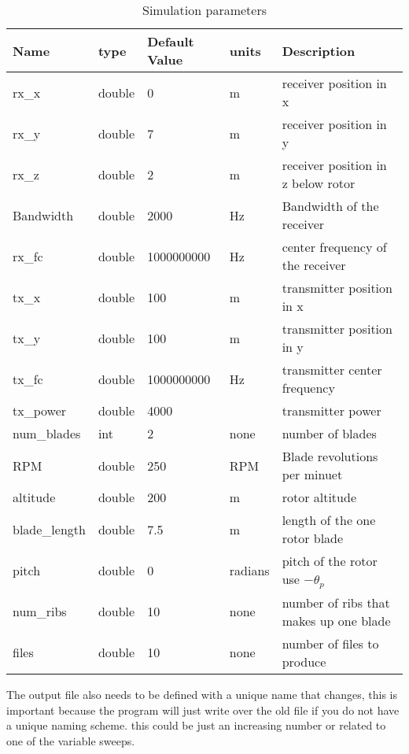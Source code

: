 \begin{table}
\begin{center}
    \begin{tabular}{ | l | l | l | l | p{3cm} |}
    \hline
    Name & type & Default Value& units & Description\\ \hline
     rx\_x &  double & 0 & m & receiver position in x  \\ \hline
     rx\_y & double & 7 & m & receiver position in y \\ \hline 
     rx\_z & double & 2 & m & receiver position in z below rotor  \\ \hline
     Bandwidth & double & 2000 & Hz & Bandwidth of the receiver  \\ \hline
     rx\_fc & double & 1000000000 & Hz & center frequency of the receiver \\ \hline 
     tx\_x & double & 100 & m & transmitter position in x \\ \hline
     tx\_y & double & 100 & m & transmitter position in y \\ \hline
     tx\_fc & double & 1000000000 & Hz & transmitter center frequency \\ \hline
     tx\_power & double & 4000 & & transmitter power \\ \hline
     num\_blades & int & 2 & none & number of blades \\ \hline
     RPM & double & 250 & RPM & Blade revolutions per minuet \\ \hline
     altitude & double & 200 & m & rotor altitude \\ \hline
     blade\_length & double & 7.5 & m & length of the one rotor blade \\ \hline
     pitch & double & 0 & radians & pitch of the rotor use $-\theta_p$  \\ \hline
     num\_ribs & double & 10 & none & number of ribs that makes up one blade \\ \hline
     files & double & 10 & none & number of files to produce \\ \hline
    \end{tabular}
     \caption{Simulation parameters}
    \label{tab:key_values}
\end{center}
\end{table}
    
The output file also needs to be defined with a unique name that changes, this is important because the program will just write over the old file if you do not have a unique naming scheme. this could be just an increasing number or related to one of the variable sweeps.

